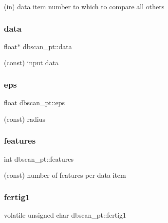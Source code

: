 (in) data item number to which to compare all others 

\mbox{\label{structdbscan__pt_a1da0197a70e570bd30de1872fe60cd6b}} 
\subsubsection{\texorpdfstring{data}{data}}
{\footnotesize\ttfamily float$\ast$ dbscan\+\_\+pt\+::data}



(const) input data 

\mbox{\label{structdbscan__pt_ae73ddeeaca04d08756b022115639d607}} 
\subsubsection{\texorpdfstring{eps}{eps}}
{\footnotesize\ttfamily float dbscan\+\_\+pt\+::eps}



(const) radius 

\mbox{\label{structdbscan__pt_a22b641c18fac3731d31e9ded8c0c93eb}} 
\subsubsection{\texorpdfstring{features}{features}}
{\footnotesize\ttfamily int dbscan\+\_\+pt\+::features}



(const) number of features per data item 

\mbox{\label{structdbscan__pt_a8ce1ed79a8f30b769dbae5a3725d0bec}} 
\subsubsection{\texorpdfstring{fertig1}{fertig1}}
{\footnotesize\ttfamily volatile unsigned char dbscan\+\_\+pt\+::fertig1}



